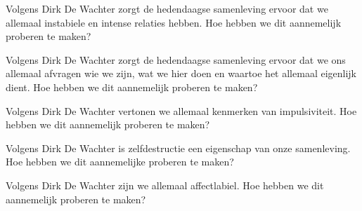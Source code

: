 \documentclass[main.tex]{subfiles}
\begin{document}
\begin{examenvraag}
    \begin{vraag}
        Volgens Dirk De Wachter zorgt de hedendaagse samenleving ervoor dat we allemaal instabiele en intense relaties hebben. Hoe hebben we dit aannemelijk proberen te maken?
    \end{vraag}

    \begin{antwoord}
    \end{antwoord}
\end{examenvraag}


\begin{examenvraag}
    \begin{vraag}
        Volgens Dirk De Wachter zorgt de hedendaagse samenleving ervoor dat we ons allemaal afvragen wie we zijn, wat we hier doen en waartoe het allemaal eigenlijk dient. Hoe hebben we dit aannemelijk proberen te maken?
    \end{vraag}

    \begin{antwoord}
    \end{antwoord}
\end{examenvraag}


\begin{examenvraag}
    \begin{vraag}
        Volgens Dirk De Wachter vertonen we allemaal kenmerken van impulsiviteit. Hoe hebben we dit aannemelijk proberen te maken?
    \end{vraag}

    \begin{antwoord}
    \end{antwoord}
\end{examenvraag}


\begin{examenvraag}
    \begin{vraag}
        Volgens Dirk De Wachter is zelfdestructie een eigenschap van onze samenleving. Hoe hebben we dit aannemelijke proberen te maken?
    \end{vraag}

    \begin{antwoord}
    \end{antwoord}
\end{examenvraag}


\begin{examenvraag}
    \begin{vraag}
        Volgens Dirk De Wachter zijn we allemaal affectlabiel. Hoe hebben we dit aannemelijk proberen te maken?
    \end{vraag}

    \begin{antwoord}
    \end{antwoord}
\end{examenvraag}
\end{document}
